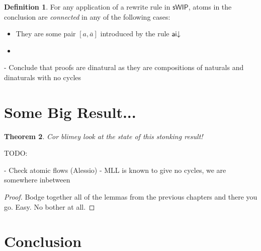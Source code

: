 \documentclass[11pt, oneside]{article}
\theoremstyle{plain}
\newtheorem{theorem}{Theorem}[section]
\theoremstyle{definition}
\newtheorem{definition}[theorem]{Definition}
\newcommand{\sSys}{{\mathsf{sWIP}}}%
\begin{document}
\begin{definition}
For any application of a rewrite rule in $\sSys$, atoms in the conclusion are \textit{connected} in any of the following cases:
\begin{itemize}
    \item They are some pair $[a,\overline{a}]$ introduced by the rule ${\mathsf {ai}}{\downarrow}$
    \item 
\end{itemize}
\end{definition}

- Conclude that proofs are dinatural as they are compositions of naturals and dinaturals with no cycles
\newpage
\section{Some Big Result...}
\begin{theorem}
    Cor blimey look at the state of this stonking result!
\end{theorem}

TODO:

- Check atomic flows (Alessio)
- MLL is known to give no cycles, we are somewhere inbetween

\begin{proof}
    Bodge together all of the lemmas from the previous chapters and there you go.
    Easy.
    No bother at all.
\end{proof}

\newpage
\section{Conclusion}

\newpage


\end{document}
